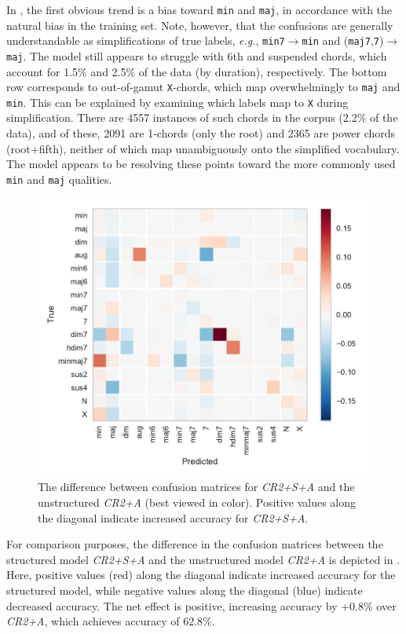 \documentclass{article}
\def\eg{\emph{e.g.\/}}
\begin{document}
In , the first obvious trend is a bias toward \texttt{min} and \texttt{maj}, in accordance with the natural bias in the training set.
Note, however, that the confusions are generally understandable as simplifications of true labels, \eg, \texttt{min7}$\rightarrow$\texttt{min} and (\texttt{maj7},\texttt{7})$\rightarrow$\texttt{maj}.
The model still appears to struggle with 6th and suspended chords, which account for 1.5\% and 2.5\% of the data (by duration), respectively.
The bottom row corresponds to out-of-gamut \texttt{X}-chords, which map overwhelmingly to \texttt{maj} and \texttt{min}.
This can be explained by examining which labels map to \texttt{X} during simplification.
There are 4557 instances of such chords in the corpus (2.2\% of the data), and of these, 2091 are 1-chords (only the root) and 2365 are power chords (root+fifth), neither of which map unambiguously onto the simplified vocabulary.
The model appears to be resolving these points toward the more commonly used \texttt{min} and \texttt{maj} qualities.

\begin{figure}
    \centering
    \includegraphics[width=\columnwidth]{confdelta}
    \caption{The difference between confusion matrices for \emph{CR2+S+A} and the unstructured \emph{CR2+A} (best viewed in color).
    Positive values along the diagonal indicate increased accuracy for \emph{CR2+S+A}.\label{fig:confdelta}}
\end{figure}

For comparison purposes, the difference in the confusion matrices between the structured model \emph{CR2+S+A} and the unstructured model \emph{CR2+A} is depicted in .
Here, positive values (red) along the diagonal indicate increased accuracy for the structured model, while negative values along the diagonal (blue) indicate decreased accuracy.
The net effect is positive, increasing accuracy by +0.8\% over \emph{CR2+A}, which achieves accuracy of 62.8\%.
\end{document}
